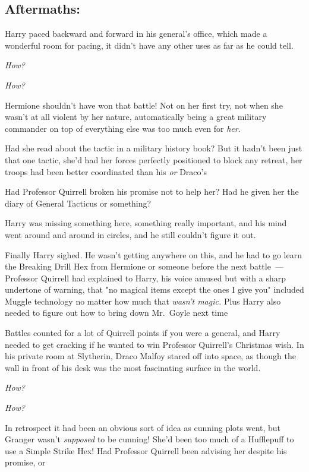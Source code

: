 
\subsection{Aftermaths:}

Harry paced backward and forward in his general's office, which made a
wonderful room for pacing, it didn't have any other uses as far as he could
tell.

\emph{How?}

\emph{How?}

Hermione shouldn't have won that battle! Not on her first try, not when she
wasn't at all violent by her nature, automatically being a great military
commander on top of everything else was too much even for \emph{her}.

Had she read about the tactic in a military history book? But it hadn't been
just that one tactic, she'd had her forces perfectly positioned to block any
retreat, her troops had been better coordinated than his \emph{or}
Draco's{\el}

Had Professor Quirrell broken his promise not to help her? Had he given her the
diary of General Tacticus or something?

Harry was missing something here, something really important, and his mind went
around and around in circles, and he still couldn't figure it out.

Finally Harry sighed. He wasn't getting anywhere on this, and he had to go
learn the Breaking Drill Hex from Hermione or someone before the next
battle~--- Professor Quirrell had explained to Harry, his voice amused but with a
sharp undertone of warning, that "no magical items except the ones I give you"
included Muggle technology no matter how much that \emph{wasn't magic.} Plus
Harry also needed to figure out how to bring down Mr.~Goyle next time{\el}

Battles counted for a lot of Quirrell points if you were a general, and Harry
needed to get cracking if he wanted to win Professor Quirrell's Christmas wish.
\sbreak
In his private room at Slytherin, Draco Malfoy stared off into space, as though
the wall in front of his desk was the most fascinating surface in the world.

\emph{How?}

\emph{How?}

In retrospect it had been an obvious sort of idea as cunning plots went, but
Granger wasn't \emph{supposed} to be cunning! She'd been too much of a
Hufflepuff to use a Simple Strike Hex! Had Professor Quirrell been advising her
despite his promise, or{\el}

